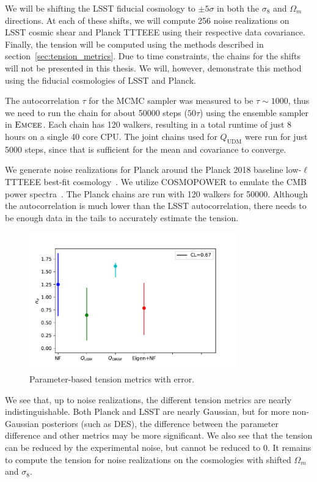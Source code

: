 We will be shifting the LSST fiducial cosmology to $\pm5\sigma$ in both the $\sigma_8$ and $\Omega_m$ directions. At each of these shifts, we will compute 256 noise realizations on LSST cosmic shear and Planck TTTEEE using their respective data covariance. Finally, the tension will be computed using the methods described in section~\ref{sec:tension_metrics}. Due to time constraints, the chains for the shifts will not be presented in this thesis. We will, however, demonstrate this method using the fiducial cosmologies of LSST and Planck.

The autocorrelation $\tau$ for the MCMC sampler was measured to be $\tau\sim1000$, thus we need to run the chain for about 50000 steps ($50\tau$) using the ensemble sampler in $\textsc{Emcee}$. Each chain has 120 walkers, resulting in a total runtime of just 8 hours on a single 40 core CPU. The joint chains used for $Q_{\mathrm{UDM}}$ were run for just 5000 steps, since that is sufficient for the mean and covariance to converge. 

We generate noise realizations for Planck around the Planck 2018 baseline low-$\ell$ TTTEEE best-fit cosmology~\cite{noauthor_planck_2018}. We utilize \textsc{COSMOPOWER} to emulate the CMB power spectra~\cite{mancini_cosmopower_2022,prince_data_2019}. The Planck chains are run with 120 walkers for 50000. Although the autocorrelation is much lower than the LSST autocorrelation, there needs to be enough data in the tails to accurately estimate the tension.
\begin{figure}[tb]
	\centering
	\includegraphics[width=0.8\textwidth]{plots/metrics_new.pdf}
	\caption{Parameter-based tension metrics with error.}
	\label{fig:tension_metrics_error}
\end{figure}

We see that, up to noise realizations, the different tension metrics are nearly indistinguishable. Both Planck and LSST are nearly Gaussian, but for more non-Gaussian posteriors (such as DES), the difference between the parameter difference and other metrics may be more significant. We also see that the tension can be reduced by the experimental noise, but cannot be reduced to 0. It remains to compute the tension for noise realizations on the cosmologies with shifted $\Omega_m$ and $\sigma_8$.

